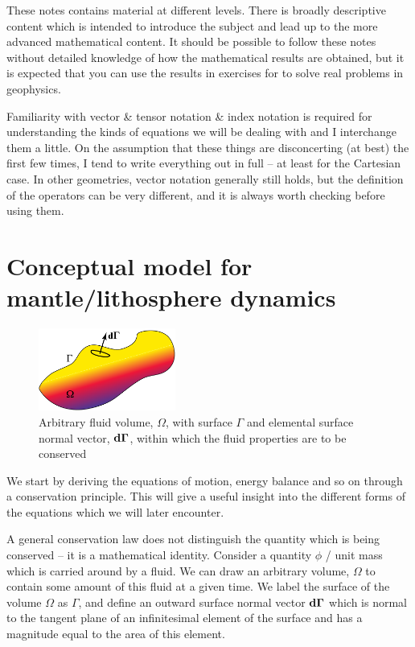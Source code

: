 \documentclass[10pt]{article}
\begin{document}
These notes contains material at different levels. There is broadly descriptive
content which is intended to introduce the subject and lead up to the more advanced
mathematical content. It should be possible to follow these notes without 
detailed knowledge of how the mathematical results are obtained, but it is 
expected that you can use the results in exercises for to solve real problems
in geophysics.

Familiarity with vector \& tensor notation \& index notation is required for
understanding the kinds of equations we will be dealing with and I interchange
them a little. On the assumption that these things are disconcerting (at best)
the first few times, I tend to write everything out in full -- at least for
the Cartesian case. In other geometries, vector notation generally still
holds, but the definition of the operators can be very different, and it is
always worth checking before using them. 

\newpage
\section{Conceptual model for mantle/lithosphere dynamics}
\begin{figure} 
	\begin{center}
		 \includegraphics[width=45mm]{Diagrams/vol_elt}
		 \caption[]{Arbitrary fluid volume, $\Omega$, with surface $\Gamma$
         and elemental surface normal vector, $\mathbf{d}\boldsymbol{\Gamma}$, within which the
         fluid properties are to be conserved}
	\end{center}	
\end{figure}

We start by deriving the equations of motion, energy balance and so on through
a conservation principle. This will give a useful insight into the different
forms of the equations which we will later encounter.

A general conservation law does not distinguish the quantity which is being
conserved -- it is a mathematical identity. Consider a quantity $\phi$ / unit
mass which is carried around by a fluid. We can draw an arbitrary volume,
$\Omega$ to contain some amount of this fluid at a given time. We label the
surface of the volume $\Omega$ as $\Gamma$, and define an outward surface
normal vector $\mathbf{d}\boldsymbol{\Gamma}$ which is normal to the tangent plane of an
infinitesimal element of the surface and has a magnitude equal to the area of
this element.
\end{document}
